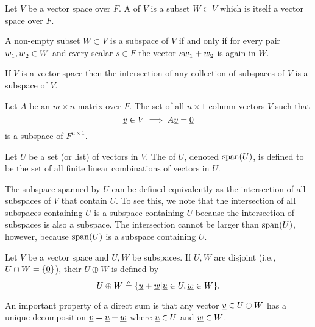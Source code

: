 \begin{definition}
Let $V$ be a vector space over $F$.
A  of $V$ is a subset $W \subset V$ which is itself a vector space over $F$.
\end{definition}

\begin{fact}
A non-empty subset $W \subset V$ is a subspace of $V$ if and only if for every pair $\underline{w}_1, \underline{w}_2 \in W$ and every scalar $s \in F$ the vector $s \underline{w}_1 + \underline{w}_2$ is again in $W$.
\end{fact}
If $V$ is a vector space then the intersection of any collection of subspaces of $V$ is a subspace of $V$.

\begin{example}
Let $A$ be an $m \times n$ matrix over $F$.
The set of all $n \times 1$ column vectors $V$ such that
\begin{equation*}
\underline{v} \in V \implies A \underline{v} = \underline{0}
\end{equation*}
is a subspace of $F^{n \times 1}$.
\end{example}

\begin{definition}
Let $U$ be a set (or list) of vectors in $V$.
The  of $U$, denoted $\mathrm{span}(U)$, is defined to be the set of all finite linear combinations of vectors in $U$.
\end{definition}

The subspace spanned by $U$ can be defined equivalently as the intersection of all subspaces of $V$ that contain $U$.
To see this, we note that the intersection of all subspaces containing $U$ is a subspace containing $U$ because the intersection of subspaces is also a subspace.
The intersection cannot be larger than $\mathrm{span}(U)$, however, because $\mathrm{span}(U)$ is a subspace containing $U$.

\begin{definition}
Let $V$ be a vector space and $U,W$ be subspaces.
If $U,W$ are disjoint (i.e., $U\cap W = \{ \underline{0} \}$), their  $U \oplus W$ is defined by
\[ U \oplus W \triangleq \{\underline{u}+\underline{w} | \underline{u} \in U, \underline{w} \in W \}. \]
\end{definition}

An important property of a direct sum is that any vector $\underline{v} \in U \oplus W$ has a unique decomposition $\underline{v} = \underline{u} + \underline{w}$ where $\underline{u} \in U$ and $\underline{w} \in W$.
 

